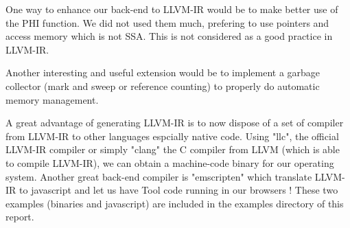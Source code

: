 One way to enhance our back-end to LLVM-IR would be to make better use of the PHI function. We did not used them much, prefering to use pointers and access memory which is not SSA. This is not considered as a good practice in LLVM-IR.

Another interesting and useful extension would be to implement a garbage collector (mark and sweep or reference counting) to properly do automatic memory management.

A great advantage of generating LLVM-IR is to now dispose of a set of compiler from LLVM-IR to other languages espcially native code. Using "llc", the official LLVM-IR compiler or simply "clang" the C compiler from LLVM (which is able to compile LLVM-IR), we can obtain a machine-code binary for our operating system. Another great back-end compiler is "emscripten" which translate LLVM-IR to javascript and let us have Tool code running in our browsers ! These two examples (binaries and javascript) are included in the examples directory of this report.